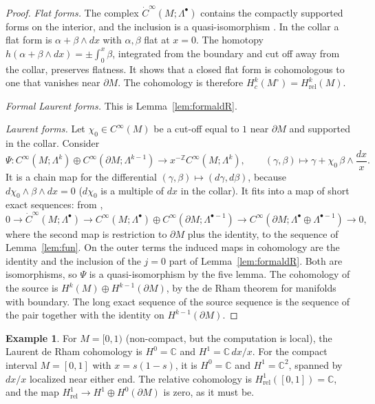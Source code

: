 \documentclass[11pt,oneside,reqno]{article}
\newcommand{\C}{\mathbb C}
\newcommand{\Z}{\mathbb Z}
\newcommand{\CI}{C^\infty}
\newcommand{\dCI}{\dot C^\infty}
\newcommand{\Hrel}{H_{\mathrm{rel}}}
\theoremstyle{plain}
\theoremstyle{definition}
\newtheorem{example}[theorem]{Example}
\theoremstyle{remark}
\begin{document}
\begin{proof}
\emph{Flat forms.} The complex \(\dCI(M;\Lambda^\bullet)\) contains the
compactly supported forms on the interior, and the inclusion is a
quasi-isomorphism \cite[p.~9]{MN}. In the collar a flat form is
\(\alpha+\beta\wedge dx\) with \(\alpha,\beta\) flat at \(x=0\). The
homotopy \(h(\alpha+\beta\wedge dx)=\pm\int_0^x\beta\), integrated from
the boundary and cut off away from the collar, preserves flatness. It
shows that a closed flat form is cohomologous to one that vanishes near
\(\partial M\). The cohomology is therefore \(H_c^k(M^\circ)=\Hrel^k(M)\).

\emph{Formal Laurent forms.} This is Lemma~\ref{lem:formaldR}.

\emph{Laurent forms.} Let \(\chi_0\in\CI(M)\) be a cut-off equal to \(1\)
near \(\partial M\) and supported in the collar. Consider
\[
 \Psi:\CI(M;\Lambda^k)\oplus\CI(\partial M;\Lambda^{k-1})\to
 x^{-\Z}\CI(M;\Lambda^k),\qquad
 (\gamma,\beta)\mapsto\gamma+\chi_0\,\beta\wedge\frac{dx}{x}.
\]
It is a chain map for the differential \((\gamma,\beta)\mapsto(d\gamma,
d\beta)\), because \(d\chi_0\wedge\beta\wedge dx=0\) (\(d\chi_0\) is a
multiple of \(dx\) in the collar). It fits into a map of short exact
sequences: from \cite[(30)]{MN},
\[
 0\to\dCI(M;\Lambda^\bullet)\to\CI(M;\Lambda^\bullet)\oplus
 \CI(\partial M;\Lambda^{\bullet-1})\to\CI(\partial M;\Lambda^\bullet\oplus
 \Lambda^{\bullet-1})\to0,
\]
where the second map is restriction to \(\partial M\) plus the identity, to
the sequence of Lemma~\ref{lem:fun}. On the outer terms the induced maps in
cohomology are the identity and the inclusion of the \(j=0\) part of
Lemma~\ref{lem:formaldR}. Both are isomorphisms, so \(\Psi\) is a
quasi-isomorphism by the five lemma. The cohomology of the source is
\(H^k(M)\oplus H^{k-1}(\partial M)\), by the de Rham theorem for manifolds
with boundary. The long exact sequence of the source sequence is the
sequence of the pair together with the identity on \(H^{k-1}(\partial
M)\).
\end{proof}

\begin{example}\label{ex:interval}
For \(M=[0,1)\) (non-compact, but the computation is local), the Laurent
de Rham cohomology is \(H^0=\C\) and \(H^1=\C\,dx/x\). For the compact
interval \(M=[0,1]\) with \(x=s(1-s)\), it is \(H^0=\C\) and
\(H^1=\C^2\), spanned by \(dx/x\) localized near either end. The relative
cohomology is \(\Hrel^1([0,1])=\C\), and the map
\(\Hrel^1\to H^1\oplus H^0(\partial M)\) is zero, as it must be.
\end{example}
\end{document}
